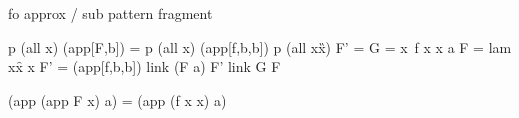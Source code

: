 \documentclass[sigconf,natbib=false]{acmart}
\begin{document}
fo approx / sub pattern fragment

\begin{elpicode}
  p (all x\app[F,x,a]) (app[F,b]) = p (all x\app[f,x,x,a]) (app[f,b,b])
  p (all x\G x) F' = 
  G = x\ f x x a
  F = lam x\f x x
  F' = (app[f,b,b])
  link (F a) F'
  link G F
\end{elpicode}



\begin{elpicode}
  (app (app F x) a) = (app (f x x) a)
\end{elpicode}

\printbibliography
\end{document}
